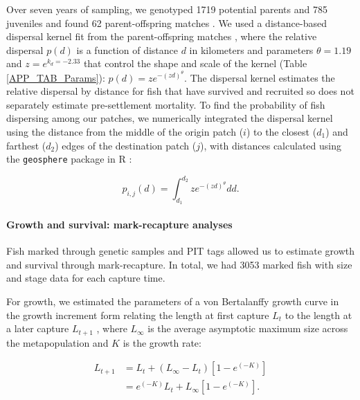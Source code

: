\documentclass[12pt, oneside]{article}   	%
\begin{document}
Over seven years of sampling, we genotyped 1719 potential parents and 785 juveniles and found 62 parent-offspring matches \citep{catalanoInPrepconnectivity}.
We used a distance-based dispersal kernel fit from the parent-offspring matches \citep{catalanoInPrepconnectivity, bode2018estimating}, where the relative dispersal $p(d)$ is a function of distance $d$ in kilometers and parameters $\theta = 1.19$ and $z = e^{k_d = -2.33}$ that control the shape and scale of the kernel (Table \ref{APP_TAB_Params}): $p(d) = ze^{-(zd)^\theta}$. The dispersal kernel estimates the relative dispersal by distance for fish that have survived and recruited so does not separately estimate pre-settlement mortality. To find the probability of fish dispersing among our patches, we numerically integrated the dispersal kernel using the distance from the middle of the origin patch ($i$) to the closest ($d_1$) and farthest ($d_2$) edges of the destination patch ($j$), with distances calculated using the \texttt{geosphere} package in R \citep{geosphere2017R}:

\begin{equation} %
p_{i, j}(d) = \int_{d_1}^{d_2} z e^{-(zd)^\theta}  dd. \label{EQN_integratingDK}
\end{equation}

\paragraph*{Growth and survival: mark-recapture analyses}

Fish marked through genetic samples and PIT tags allowed us to estimate growth and survival through mark-recapture. In total, we had 3053 marked fish with size and stage data for each capture time. 

For growth, we estimated the parameters of a von Bertalanffy growth curve in the growth increment form relating the length at first capture $L_t$ to the length at a later capture $L_{t+1}$ \citep{hart2009estimating}, where $L_\infty$ is the average asymptotic maximum size across the metapopulation and $K$ is the growth rate: %

\begin{equation} \label{EQN_VBL} 
\begin{split}
L_{t+1} & = L_t + (L_\infty - L_t)[1 - e^{(-K)}] \\
 & = e^{(-K)}L_t + L_\infty[1 - e^{(-K)}].
\end{split}
\end{equation}
\end{document}
